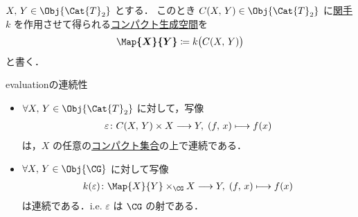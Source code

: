 \documentclass[algtopo_main]{subfiles}
\begin{document}
\begin{mydef}[label=def:CG-Map]{}
    $X,\, Y \in \Obj{\Cat{T}_2}$ とする．
    このとき $C(X,\, Y) \in \Obj{\Cat{T}_2}$ に\hyperref[def:k-functor]{関手 $k$} を作用させて得られる\hyperref[def:CG]{コンパクト生成空間}を
    \begin{align}
        \bm{\Map{X}{Y}} \coloneqq k \bigl( C(X,\, Y) \bigr) 
    \end{align}
    と書く．
\end{mydef}

\begin{mylem}[label=lem:CG-eval]{evaluationの連続性}
    \begin{itemize}
        \item $\forall X,\, Y \in \Obj{\Cat{T}_2}$ に対して，写像
        \begin{align}
            \varepsilon \colon C(X,\, Y) \times X \longrightarrow Y,\; (f,\, x) \longmapsto f(x)
        \end{align}
        は，$X$ の任意の\hyperref[def:compact]{コンパクト集合}の上で連続である．
        \item $\forall X,\, Y \in \Obj{\CG}$ に対して写像
        \begin{align}
            k(\varepsilon) \colon \Map{X}{Y} \times_{\CG} X \lto Y,\; (f,\, x) \lmto f(x)
        \end{align}
        は連続である．i.e. $\varepsilon$ は $\CG$ の射である．
    \end{itemize}
    
\end{mylem}
\end{document}
